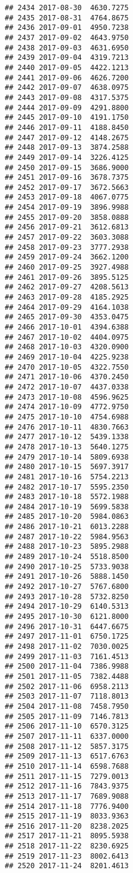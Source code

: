\documentclass[
]{article}
\begin{document}
\begin{verbatim}
## 2434 2017-08-30  4630.7275
## 2435 2017-08-31  4764.8675
## 2436 2017-09-01  4950.7238
## 2437 2017-09-02  4643.9750
## 2438 2017-09-03  4631.6950
## 2439 2017-09-04  4319.7213
## 2440 2017-09-05  4422.1213
## 2441 2017-09-06  4626.7200
## 2442 2017-09-07  4638.0975
## 2443 2017-09-08  4317.5375
## 2444 2017-09-09  4291.8800
## 2445 2017-09-10  4191.1750
## 2446 2017-09-11  4188.8450
## 2447 2017-09-12  4148.2675
## 2448 2017-09-13  3874.2588
## 2449 2017-09-14  3226.4125
## 2450 2017-09-15  3686.9000
## 2451 2017-09-16  3678.7375
## 2452 2017-09-17  3672.5663
## 2453 2017-09-18  4067.0775
## 2454 2017-09-19  3896.9988
## 2455 2017-09-20  3858.0888
## 2456 2017-09-21  3612.6813
## 2457 2017-09-22  3603.3088
## 2458 2017-09-23  3777.2938
## 2459 2017-09-24  3662.1200
## 2460 2017-09-25  3927.4988
## 2461 2017-09-26  3895.5125
## 2462 2017-09-27  4208.5613
## 2463 2017-09-28  4185.2925
## 2464 2017-09-29  4164.1038
## 2465 2017-09-30  4353.0475
## 2466 2017-10-01  4394.6388
## 2467 2017-10-02  4404.0975
## 2468 2017-10-03  4320.0900
## 2469 2017-10-04  4225.9238
## 2470 2017-10-05  4322.7550
## 2471 2017-10-06  4370.2450
## 2472 2017-10-07  4437.0338
## 2473 2017-10-08  4596.9625
## 2474 2017-10-09  4772.9750
## 2475 2017-10-10  4754.6988
## 2476 2017-10-11  4830.7663
## 2477 2017-10-12  5439.1338
## 2478 2017-10-13  5640.1275
## 2479 2017-10-14  5809.6938
## 2480 2017-10-15  5697.3917
## 2481 2017-10-16  5754.2213
## 2482 2017-10-17  5595.2350
## 2483 2017-10-18  5572.1988
## 2484 2017-10-19  5699.5838
## 2485 2017-10-20  5984.0863
## 2486 2017-10-21  6013.2288
## 2487 2017-10-22  5984.9563
## 2488 2017-10-23  5895.2988
## 2489 2017-10-24  5518.8500
## 2490 2017-10-25  5733.9038
## 2491 2017-10-26  5888.1450
## 2492 2017-10-27  5767.6800
## 2493 2017-10-28  5732.8250
## 2494 2017-10-29  6140.5313
## 2495 2017-10-30  6121.8000
## 2496 2017-10-31  6447.6675
## 2497 2017-11-01  6750.1725
## 2498 2017-11-02  7030.0025
## 2499 2017-11-03  7161.4513
## 2500 2017-11-04  7386.9988
## 2501 2017-11-05  7382.4488
## 2502 2017-11-06  6958.2113
## 2503 2017-11-07  7118.8013
## 2504 2017-11-08  7458.7950
## 2505 2017-11-09  7146.7813
## 2506 2017-11-10  6570.3125
## 2507 2017-11-11  6337.0000
## 2508 2017-11-12  5857.3175
## 2509 2017-11-13  6517.6763
## 2510 2017-11-14  6598.7688
## 2511 2017-11-15  7279.0013
## 2512 2017-11-16  7843.9375
## 2513 2017-11-17  7689.9088
## 2514 2017-11-18  7776.9400
## 2515 2017-11-19  8033.9363
## 2516 2017-11-20  8238.2025
## 2517 2017-11-21  8095.5938
## 2518 2017-11-22  8230.6925
## 2519 2017-11-23  8002.6413
## 2520 2017-11-24  8201.4613

\end{verbatim}
\end{document}
